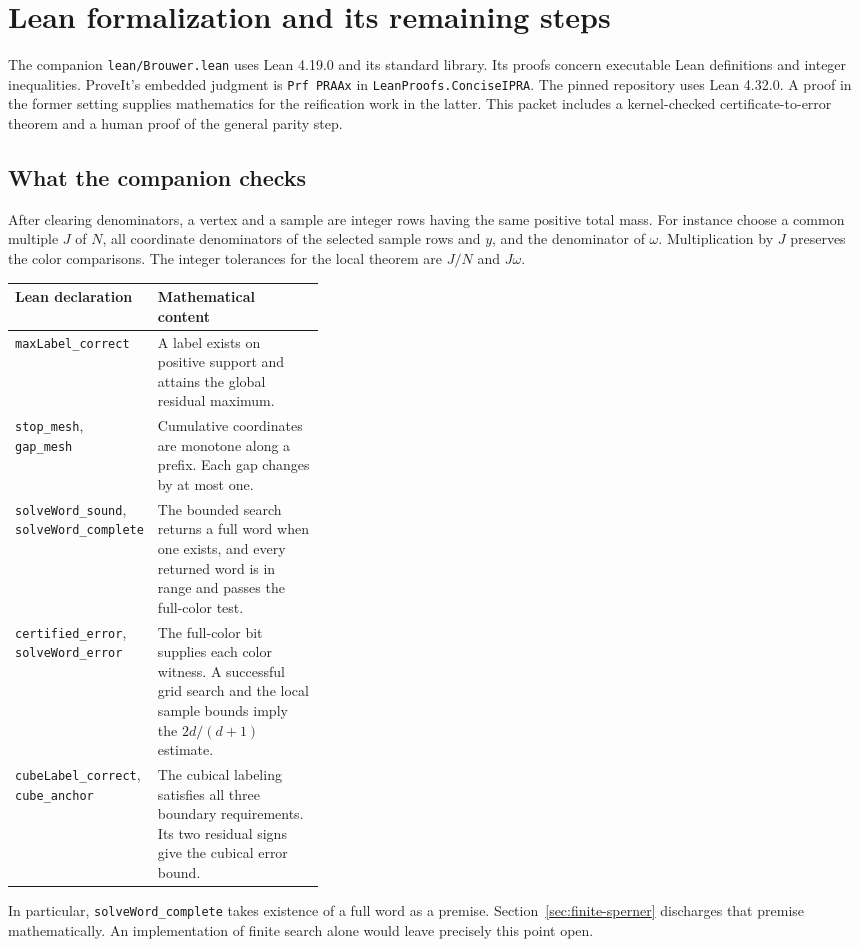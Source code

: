 \section{Lean formalization and its remaining steps}\label{sec:lean}

The companion \texttt{lean/Brouwer.lean} uses Lean 4.19.0 and its standard
library. Its proofs concern executable Lean definitions and integer
inequalities. ProveIt's embedded judgment is
\texttt{Prf PRAAx} in \texttt{LeanProofs.ConciseIPRA}. The pinned repository
uses Lean 4.32.0. A proof in the former setting supplies mathematics for the
reification work in the latter. This packet includes a kernel-checked
certificate-to-error theorem and a human proof of the general parity step.

\subsection{What the companion checks}
After clearing denominators, a vertex and a sample are integer rows having
the same positive total mass. For instance choose a common multiple $J$ of
$N$, all coordinate denominators of the selected sample rows and $y$, and the
denominator of $\omega$. Multiplication by $J$ preserves the color comparisons.
The integer tolerances for the local theorem are $J/N$ and $J\omega$.

\begin{center}\small
\begin{tabularx}{\linewidth}{@{}>{\raggedright\arraybackslash}p{0.36\linewidth}>{\raggedright\arraybackslash}X@{}}
\toprule
\textsf{Lean declaration} & \textsf{Mathematical content}\\
\midrule
\texttt{maxLabel\_correct} &
A label exists on positive support and attains the global residual maximum.\\[2pt]
\texttt{stop\_mesh}, \texttt{gap\_mesh} &
Cumulative coordinates are monotone along a prefix. Each gap changes by at most one.\\[2pt]
\texttt{solveWord\_sound}, \texttt{solveWord\_complete} &
The bounded search returns a full word when one exists, and every returned word is in range and passes the full-color test.\\[2pt]
\texttt{certified\_error}, \texttt{solveWord\_error} &
The full-color bit supplies each color witness. A successful grid search and the local sample bounds imply the $2d/(d+1)$ estimate.\\[2pt]
\texttt{cubeLabel\_correct}, \texttt{cube\_anchor} &
The cubical labeling satisfies all three boundary requirements. Its two residual signs give the cubical error bound.\\
\bottomrule
\end{tabularx}
\end{center}
In particular, \texttt{solveWord\_complete} takes existence of a full word
as a premise. Section~\ref{sec:finite-sperner} discharges that premise
mathematically. An implementation of finite search alone would leave precisely
this point open.

